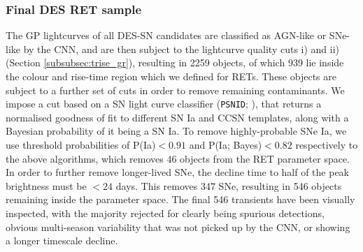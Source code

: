 \documentclass[fleqn,usenatbib,]{mnras}
\newcommand{\replyref}[1]{\color{magenta}#1 \color{black}}
\begin{document}
\subsubsection{Final DES RET sample}
The GP lightcurves of all DES-SN candidates are classified as AGN-like or SNe-like by the CNN, and are then subject to the lightcurve quality cuts i) and ii) (Section \ref{subsubsec:trise_gr}), resulting in 2259 objects, of which 939 lie inside the colour and rise-time region which we defined for RETs. These objects are subject to a further set of cuts in order to remove remaining contaminants. We impose a cut based on a SN \replyref{light curve} classifier (\texttt{PSNID}; \citealt{Sako2008}), that returns a normalised goodness of fit to different SN Ia and CCSN templates, along with a Bayesian probability of it being a SN Ia. To remove highly-probable SNe Ia, we use threshold probabilities of P(Ia)$<0.91$ and P(Ia; Bayes)$<0.82$ respectively to the above algorithms, which removes 46 objects from the RET parameter space. In order to further remove longer-lived SNe, the decline time to half of the peak brightness must be $<24$ days. This removes 347 SNe, resulting in 546 objects remaining inside the parameter space. The final 546 transients have been visually inspected, with the majority rejected for clearly being spurious detections, obvious multi-season variability that was not picked up by the CNN, or showing a longer timescale decline. 
\end{document}
